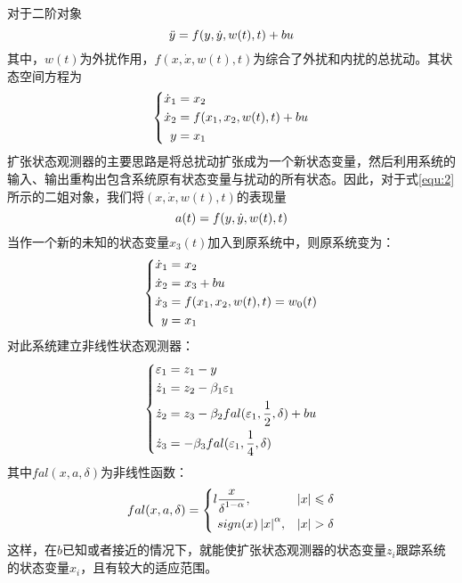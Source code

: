 对于二阶对象
\begin{equation}
\centering
\label{}
\ddot y = f(y,\dot y,w(t),t) + bu
\end{equation}
其中，$w(t)$为外扰作用，$f(x,\dot x,w(t),t)$为综合了外扰和内扰的总扰动。其状态空间方程为
\begin{equation}
\centering
\label{}
\left\{ \begin{aligned}
\dot x_1 &= x_2\\
\dot x_2 &= f(x_1,x_2,w(t),t) + bu\\
y &= x_1
\end{aligned} \right.
\end{equation}
扩张状态观测器的主要思路是将总扰动扩张成为一个新状态变量，然后利用系统的输入、输出重构出包含系统原有状态变量与扰动的所有状态。因此，对于式\ref{equ:2}所示的二姐对象，我们将$(x,\dot x,w(t),t)$的表现量
\begin{equation}
\centering
\label{}
a(t) = f(y,\dot y,w(t),t)
\end{equation}
当作一个新的未知的状态变量$x_3(t)$加入到原系统中，则原系统变为：
\begin{equation}
\centering
\label{}
\left\{ \begin{aligned}
\dot x_1 &= x_2\\
\dot x_2 &= x_3 + bu\\
\dot x_3 &= f(x_1,x_2,w(t),t) = w_0(t)\\
y &= x_1
\end{aligned} \right.
\end{equation}
对此系统建立非线性状态观测器：
\begin{equation}
\centering
\label{}
\left\{ \begin{aligned}
\varepsilon _1 &= z_1 - y\\
\dot z_1 &= z_2 - \beta_1\varepsilon_1\\
\dot z_2 &= z_3 - \beta_2fal(\varepsilon_1,\frac{1}{2},\delta) + bu\\
\dot z_3 &= -\beta_3fal(\varepsilon_1,\frac{1}{4},\delta)
\end{aligned} \right.
\end{equation}
其中$fal(x,a,\delta)$为非线性函数：
\begin{equation}
\centering
\label{}
fal(x,a,\delta ) = \left\{ \begin{aligned}{l}
&\frac{x}{{\mathop \delta \nolimits^{1 - \alpha } }},&|x| \le \delta \\
&sign(x)\mathop {|x|}\nolimits^\alpha,&|x| > \delta 
\end{aligned} \right.
\end{equation}
这样，在$b$已知或者接近的情况下，就能使扩张状态观测器的状态变量$z_i$跟踪系统的状态变量$x_i$，且有较大的适应范围。


